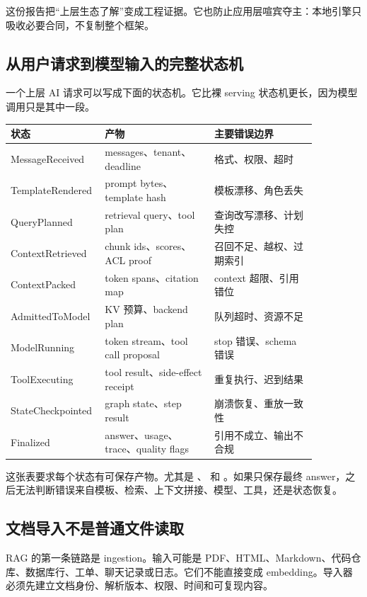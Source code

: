这份报告把“上层生态了解”变成工程证据。它也防止应用层喧宾夺主：本地引擎只吸收必要合同，不复制整个框架。

\subsection{从用户请求到模型输入的完整状态机}

一个上层 AI 请求可以写成下面的状态机。它比裸 serving 状态机更长，因为模型调用只是其中一段。

\begin{center}
\small
\begin{tabular}{p{0.20\linewidth}p{0.34\linewidth}p{0.32\linewidth}}
\toprule
状态 & 产物 & 主要错误边界 \\
\midrule
MessageReceived & messages、tenant、deadline & 格式、权限、超时 \\
TemplateRendered & prompt bytes、template hash & 模板漂移、角色丢失 \\
QueryPlanned & retrieval query、tool plan & 查询改写漂移、计划失控 \\
ContextRetrieved & chunk ids、scores、ACL proof & 召回不足、越权、过期索引 \\
ContextPacked & token spans、citation map & context 超限、引用错位 \\
AdmittedToModel & KV 预算、backend plan & 队列超时、资源不足 \\
ModelRunning & token stream、tool call proposal & stop 错误、schema 错误 \\
ToolExecuting & tool result、side-effect receipt & 重复执行、迟到结果 \\
StateCheckpointed & graph state、step result & 崩溃恢复、重放一致性 \\
Finalized & answer、usage、trace、quality flags & 引用不成立、输出不合规 \\
\bottomrule
\end{tabular}
\end{center}

这张表要求每个状态有可保存产物。尤其是 、 和 。如果只保存最终 answer，之后无法判断错误来自模板、检索、上下文拼接、模型、工具，还是状态恢复。

\subsection{文档导入不是普通文件读取}

RAG 的第一条链路是 ingestion。输入可能是 PDF、HTML、Markdown、代码仓库、数据库行、工单、聊天记录或日志。它们不能直接变成 embedding。导入器必须先建立文档身份、解析版本、权限、时间和可复现内容。

